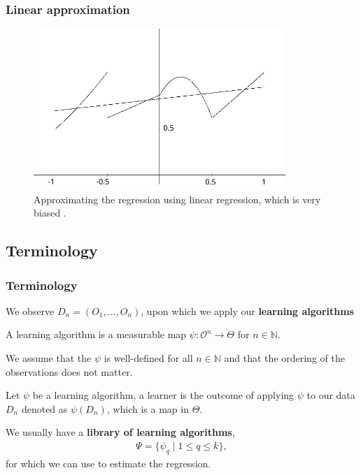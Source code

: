 \documentclass{beamer}
\newcommand{\q}{q}
\newcommand{\ml}{k}
\newcommand{\la}{\psi}
\newcommand{\lib}{\Psi}
\begin{document}
\begin{frame}
    \frametitle{Linear approximation}
    \begin{figure}[H]
        \centering
        \includegraphics[width=0.85\textwidth]{figures/linearestimate}
        \caption{Approximating the regression using linear regression, which is very biased \citep{gyorfi2002distribution}.}
    \end{figure}
\end{frame}

\subsection{Terminology}
\begin{frame}
    \frametitle{Terminology}
    We observe $ D_n = (O_1 , \dots , O_n) $, upon which we apply our \textbf{learning algorithms}  
    \begin{definition}
        A learning algorithm is a measurable map $ \la : \mathcal{O}^{n} \to \Theta $ for $ n \in \mathbb{N} $. 
    \end{definition}
    We assume that the $ \la $ is well-defined for all $ n \in \mathbb{N} $ and that the ordering of the observations does not matter.  
    \begin{definition}
        Let $ \la $ be a learning algorithm, a learner is the outcome of applying $ \la $ to our data $ D_n $ denoted as $ \la(D_n) $, which is a map in $ \Theta $.
    \end{definition}
    We usually have a \textbf{library of learning algorithms}, 
    \begin{align*}
        \lib = \{\la_{\q} \mid 1 \leq \q \leq\ml \},
    \end{align*}
    for which we can use to estimate the regression.  
\end{frame}
\end{document}
